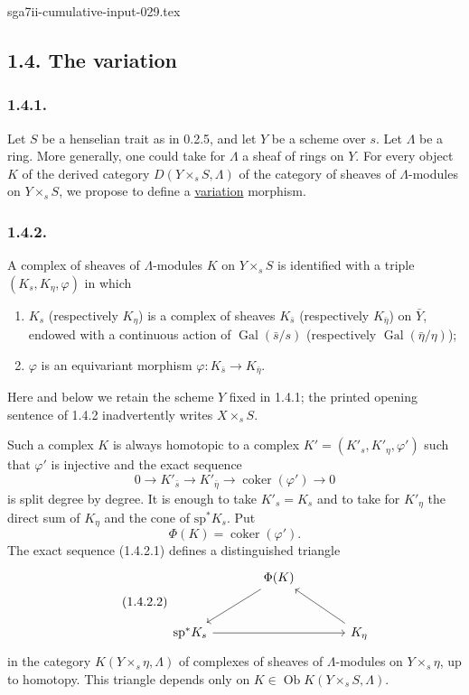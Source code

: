 \begin{filecontents*}{sga7ii-cumulative-input-029.tex}
\subsection*{1.4. The variation}

\subsubsection*{1.4.1.}
Let $S$ be a henselian trait as in 0.2.5, and let $Y$ be a scheme over
$s$.  Let $\Lambda$ be a ring.  More generally, one could take for
$\Lambda$ a sheaf of rings on $Y$.  For every object $K$ of the
derived category $D(Y\times_sS,\Lambda)$ of the category of sheaves of
$\Lambda$-modules on $Y\times_sS$, we propose to define a
\underline{variation} morphism.

\subsubsection*{1.4.2.}
A complex of sheaves of $\Lambda$-modules $K$ on $Y\times_sS$ is
identified with a triple $(K_s,K_\eta,\varphi)$ in which
\begin{enumerate}[label=\alph*)]
\item $K_s$ (respectively $K_\eta$) is a complex of sheaves
$K_{\bar s}$ (respectively $K_{\bar\eta}$) on $\bar Y$, endowed with a
continuous action of $\operatorname{Gal}(\bar s/s)$ (respectively
$\operatorname{Gal}(\bar\eta/\eta)$);

\item $\varphi$ is an equivariant morphism
$\varphi:K_{\bar s}\longrightarrow K_{\bar\eta}$.
\end{enumerate}
Here and below we retain the scheme $Y$ fixed in 1.4.1; the printed
opening sentence of 1.4.2 inadvertently writes $X\times_sS$.

Such a complex $K$ is always homotopic to a complex
$K'=(K'_s,K'_\eta,\varphi')$ such that $\varphi'$ is injective and the
exact sequence
\begin{equation}\tag{1.4.2.1}
0\longrightarrow K'_{\bar s}
\longrightarrow K'_{\bar\eta}
\longrightarrow\operatorname{coker}(\varphi')
\longrightarrow0
\end{equation}
is split degree by degree.  It is enough to take $K'_s=K_s$ and to
take for $K'_\eta$ the direct sum of $K_\eta$ and the cone of
$\mathrm{sp}^*K_s$.  Put
\begin{equation*}
\Phi(K)=\operatorname{coker}(\varphi').
\end{equation*}
The exact sequence (1.4.2.1) defines a distinguished triangle
\begin{equation}\tag{1.4.2.2}
\begin{tikzcd}[column sep=large, row sep=large]
{} & \Phi(K) \arrow[dl] & {} \\
\mathrm{sp}^*K_s \arrow[rr] & {} & K_\eta \arrow[ul]
\end{tikzcd}
\end{equation}
in the category $K(Y\times_s\eta,\Lambda)$ of complexes of sheaves of
$\Lambda$-modules on $Y\times_s\eta$, up to homotopy.  This triangle
depends only on $K\in\operatorname{Ob}K(Y\times_sS,\Lambda)$.


\end{filecontents*}

